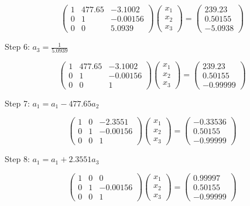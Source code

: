 \documentclass[]{article}
\begin{document}
\[
\left(\begin{array}{ccc} 
1 & 477.65 & -3.1002\\
0 & 1 & -0.00156\\
0 & 0 & 5.0939
\end{array}\right)
\left(\begin{array}{c} 
x_1 \\
x_2 \\
x_3
\end{array}\right) =
\left(\begin{array}{c}
239.23 \\
0.50155 \\
-5.0938
\end{array}\right)
\]

Step 6: \(a_3 = \frac{1}{5.0939}\)

\[
\left(\begin{array}{ccc} 
1 & 477.65 & -3.1002\\
0 & 1 & -0.00156\\
0 & 0 & 1
\end{array}\right)
\left(\begin{array}{c} 
x_1 \\
x_2 \\
x_3
\end{array}\right) =
\left(\begin{array}{c}
239.23 \\
0.50155 \\
-0.99999
\end{array}\right)
\]

Step 7: \(a_1 = a_1 - 477.65 a_2\)

\[
\left(\begin{array}{ccc} 
1 & 0 & -2.3551\\
0 & 1 & -0.00156\\
0 & 0 & 1
\end{array}\right)
\left(\begin{array}{c} 
x_1 \\
x_2 \\
x_3
\end{array}\right) =
\left(\begin{array}{c}
-0.33536 \\
0.50155 \\
-0.99999
\end{array}\right)
\]

Step 8: \(a_1 = a_1 + 2.3551a_3\)

\[
\left(\begin{array}{ccc} 
1 & 0 & 0\\
0 & 1 & -0.00156\\
0 & 0 & 1
\end{array}\right)
\left(\begin{array}{c} 
x_1 \\
x_2 \\
x_3
\end{array}\right) =
\left(\begin{array}{c}
0.99997 \\
0.50155 \\
-0.99999
\end{array}\right)
\]
\end{document}
